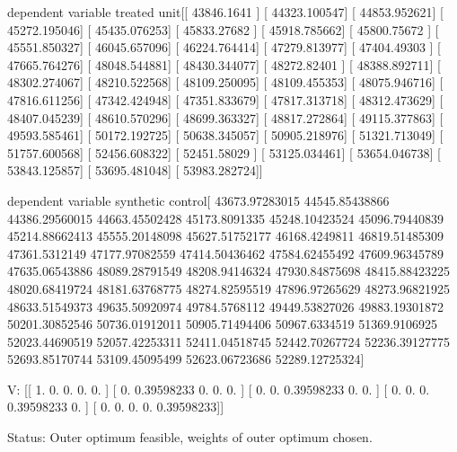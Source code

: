 dependent variable treated unit[[ 43846.1641  ]
 [ 44323.100547]
 [ 44853.952621]
 [ 45272.195046]
 [ 45435.076253]
 [ 45833.27682 ]
 [ 45918.785662]
 [ 45800.75672 ]
 [ 45551.850327]
 [ 46045.657096]
 [ 46224.764414]
 [ 47279.813977]
 [ 47404.49303 ]
 [ 47665.764276]
 [ 48048.544881]
 [ 48430.344077]
 [ 48272.82401 ]
 [ 48388.892711]
 [ 48302.274067]
 [ 48210.522568]
 [ 48109.250095]
 [ 48109.455353]
 [ 48075.946716]
 [ 47816.611256]
 [ 47342.424948]
 [ 47351.833679]
 [ 47817.313718]
 [ 48312.473629]
 [ 48407.045239]
 [ 48610.570296]
 [ 48699.363327]
 [ 48817.272864]
 [ 49115.377863]
 [ 49593.585461]
 [ 50172.192725]
 [ 50638.345057]
 [ 50905.218976]
 [ 51321.713049]
 [ 51757.600568]
 [ 52456.608322]
 [ 52451.58029 ]
 [ 53125.034461]
 [ 53654.046738]
 [ 53843.125857]
 [ 53695.481048]
 [ 53983.282724]]

dependent variable synthetic control[ 43673.97283015  44545.85438866  44386.29560015  44663.45502428
  45173.8091335   45248.10423524  45096.79440839  45214.88662413
  45555.20148098  45627.51752177  46168.4249811   46819.51485309
  47361.5312149   47177.97082559  47414.50436462  47584.62455492
  47609.96345789  47635.06543886  48089.28791549  48208.94146324
  47930.84875698  48415.88423225  48020.68419724  48181.63768775
  48274.82595519  47896.97265629  48273.96821925  48633.51549373
  49635.50920974  49784.5768112   49449.53827026  49883.19301872
  50201.30852546  50736.01912011  50905.71494406  50967.6334519
  51369.9106925   52023.44690519  52057.42253311  52411.04518745
  52442.70267724  52236.39127775  52693.85170744  53109.45095499
  52623.06723686  52289.12725324]

 V:
[[ 1.          0.          0.          0.          0.        ]
 [ 0.          0.39598233  0.          0.          0.        ]
 [ 0.          0.          0.39598233  0.          0.        ]
 [ 0.          0.          0.          0.39598233  0.        ]
 [ 0.          0.          0.          0.          0.39598233]]

 Status:
Outer optimum feasible, weights of outer optimum chosen.